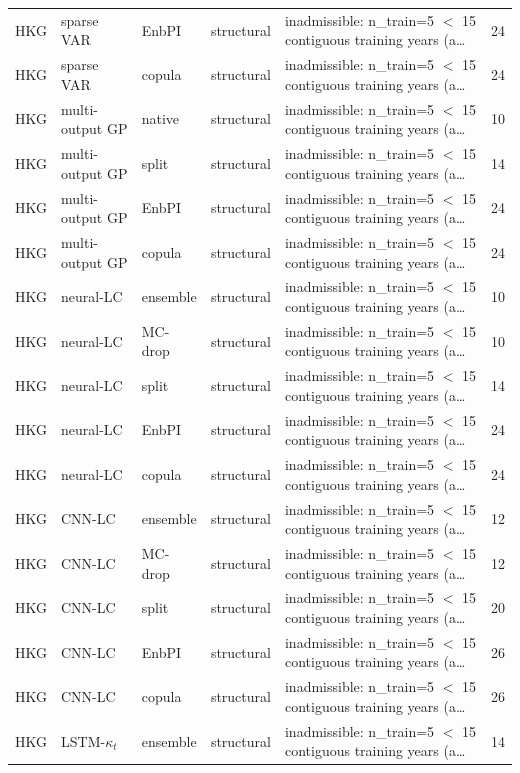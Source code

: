 {\begin{longtable}{@{}lllp{1.6cm}p{6.2cm}r@{}}
HKG & sparse VAR & EnbPI & structural & inadmissible: n\_train=5 $<$ 15 contiguous training years (a\ldots & 24 \\
HKG & sparse VAR & copula & structural & inadmissible: n\_train=5 $<$ 15 contiguous training years (a\ldots & 24 \\
HKG & multi-output GP & native & structural & inadmissible: n\_train=5 $<$ 15 contiguous training years (a\ldots & 10 \\
HKG & multi-output GP & split & structural & inadmissible: n\_train=5 $<$ 15 contiguous training years (a\ldots & 14 \\
HKG & multi-output GP & EnbPI & structural & inadmissible: n\_train=5 $<$ 15 contiguous training years (a\ldots & 24 \\
HKG & multi-output GP & copula & structural & inadmissible: n\_train=5 $<$ 15 contiguous training years (a\ldots & 24 \\
HKG & neural-LC & ensemble & structural & inadmissible: n\_train=5 $<$ 15 contiguous training years (a\ldots & 10 \\
HKG & neural-LC & MC-drop & structural & inadmissible: n\_train=5 $<$ 15 contiguous training years (a\ldots & 10 \\
HKG & neural-LC & split & structural & inadmissible: n\_train=5 $<$ 15 contiguous training years (a\ldots & 14 \\
HKG & neural-LC & EnbPI & structural & inadmissible: n\_train=5 $<$ 15 contiguous training years (a\ldots & 24 \\
HKG & neural-LC & copula & structural & inadmissible: n\_train=5 $<$ 15 contiguous training years (a\ldots & 24 \\
HKG & CNN-LC & ensemble & structural & inadmissible: n\_train=5 $<$ 15 contiguous training years (a\ldots & 12 \\
HKG & CNN-LC & MC-drop & structural & inadmissible: n\_train=5 $<$ 15 contiguous training years (a\ldots & 12 \\
HKG & CNN-LC & split & structural & inadmissible: n\_train=5 $<$ 15 contiguous training years (a\ldots & 20 \\
HKG & CNN-LC & EnbPI & structural & inadmissible: n\_train=5 $<$ 15 contiguous training years (a\ldots & 26 \\
HKG & CNN-LC & copula & structural & inadmissible: n\_train=5 $<$ 15 contiguous training years (a\ldots & 26 \\
HKG & LSTM-$\kappa_t$ & ensemble & structural & inadmissible: n\_train=5 $<$ 15 contiguous training years (a\ldots & 14 \\

\end{longtable}}
